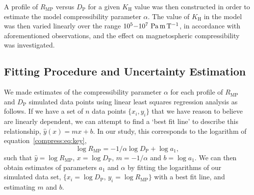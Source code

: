 A profile of $R_\mathrm{MP}$ versus $D_\mathrm{P}$ for a given $K_\mathrm{H}$ value was then constructed in order to estimate the model compressibility parameter $\alpha$. The value of $K_\mathrm{H}$ in the model was then varied linearly over the range $10^5{\--}10^7~\si{\pascal\meter\per\tesla}$, in accordance with aforementioned  observations, and the effect on magnetospheric compressibility was investigated. 


\subsection{Fitting Procedure and Uncertainty Estimation}
We made estimates of the compressibility parameter $\alpha$ for each profile of $R_\mathrm{MP}$ and $D_\mathrm{P}$ simulated data points using linear least squares regression analysis as follows. If we have a set of $n$ data points $\{x_i,y_i\}$ that we have reason to believe are linearly dependent, we can attempt to find a `best fit line' to describe this relationship, $\hat{y}(x) = mx + b$. In our study, this corresponds to the logarithm of equation~\ref{compress:eq:key},
\begin{equation}
\log{R_\mathrm{MP}}{=}-1/{\alpha}\log {D_\mathrm{P}}+\log{a_1},
\end{equation}
such that $\hat{y} = \log{R_\mathrm{MP}}$, $x =\log{D_\mathrm{P}}$, $ m = -1/\alpha$ and $b = \log{a_1}$. We can then obtain estimates of parameters $a_1$ and $\alpha$ by fitting the logarithms of our simulated data set, $\{x_i=\log{D_\mathrm{P}}$, $y_i=\log{R_\mathrm{MP}}\}$ with a best fit line, and estimating $m$ and $b$.

